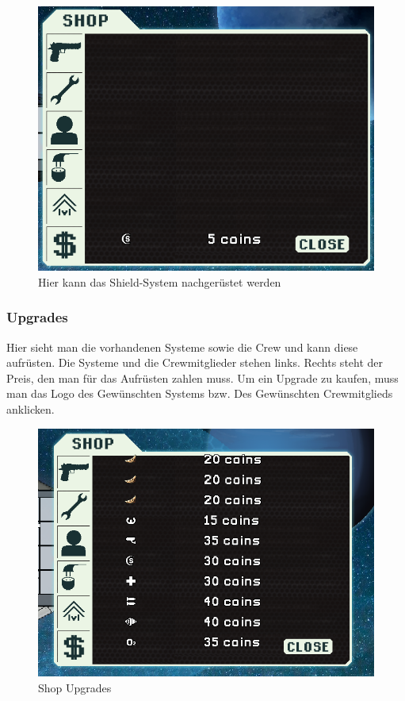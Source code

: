 \documentclass[fontsize=12pt,paper=a4,twoside]{scrartcl}
\begin{document}
\begin{figure}[H]
\centering
\includegraphics[width=1\linewidth]{DasSpiel/Shop/sys.png}
\caption{Hier kann das Shield-System nachgerüstet werden}
\end{figure}

\subsubsection{Upgrades}

Hier sieht man die vorhandenen Systeme sowie die Crew und kann diese aufrüsten. Die Systeme und die Crewmitglieder stehen links. Rechts steht der Preis, den man für das Aufrüsten zahlen muss. Um ein Upgrade zu kaufen, muss man das Logo des Gewünschten Systems bzw. Des Gewünschten Crewmitglieds anklicken. 

\begin{figure}[H]
\centering
\includegraphics[width=1\linewidth]{DasSpiel/Shop/upgrades.png}
\caption{Shop Upgrades}
\end{figure}
\end{document}

